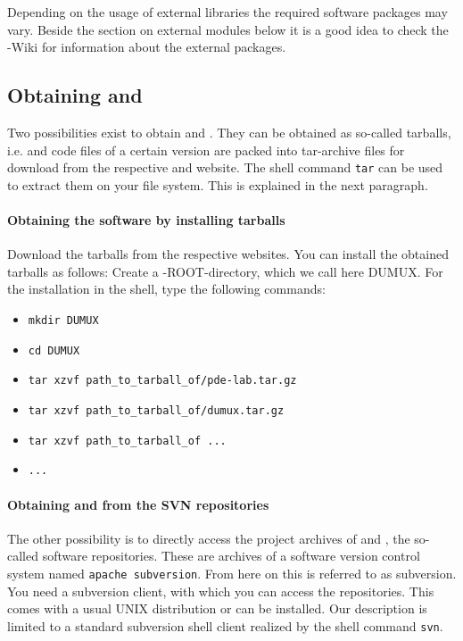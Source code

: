 Depending on the usage of external libraries the required software packages may vary. 
Beside the section on external modules below it is a good idea to check the {\Dune}-Wiki \cite{DUNE-HP} for information about the external packages.

\subsection{Obtaining \Dune and \Dumux}
Two possibilities exist to obtain \Dune and \Dumux. 
They can be obtained as so-called tarballs, i.e. \Dumux and \Dune code files of a certain version are packed into tar-archive files for download from the respective {\Dune} and {\Dumux} website. 
The shell command \texttt{tar} can be used to extract them on your file system. This is explained in the next paragraph. 

\paragraph{Obtaining the software by installing tarballs}
Download the tarballs from the respective websites. You can install the obtained tarballs as follows: Create a {\Dune}-ROOT-directory, which we call here DUMUX. 
For the installation in the shell, type the following commands: 
\begin{itemize}
\item \texttt{mkdir DUMUX}
\item \texttt{cd DUMUX}
\item \texttt{tar xzvf path\_to\_tarball\_of/pde-lab.tar.gz}
\item \texttt{tar xzvf path\_to\_tarball\_of/dumux.tar.gz}
\item \texttt{tar xzvf path\_to\_tarball\_of ...}
\item \texttt{...}
\end{itemize} 

\paragraph{Obtaining \Dune and \Dumux from the SVN repositories} 
The other possibility is to directly access the project archives of \Dune and \Dumux, the so-called software repositories. 
These are archives of a software version control system named \texttt{apache subversion}. 
From here on this is referred to as subversion.
You need a subversion client, with which you can access the repositories. 
This comes with a usual UNIX distribution or can be installed. Our description is limited to a standard subversion shell client realized by the shell command \texttt{svn}.

